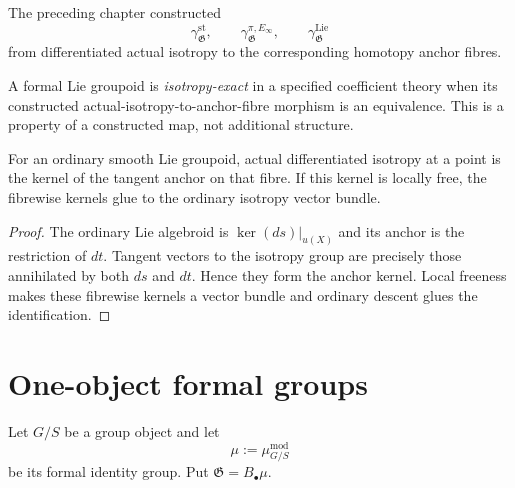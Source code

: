 The preceding chapter constructed
\[
    \gamma_{\mathfrak G}^{\mathrm{st}},
    \qquad
    \gamma_{\mathfrak G}^{\pi,E_\infty},
    \qquad
    \gamma_{\mathfrak G}^{\mathrm{Lie}}
\]
from differentiated actual isotropy to the corresponding homotopy anchor
fibres.

\begin{definition}
\label{def:as-isotropy-exact}
A formal Lie groupoid is \emph{isotropy-exact} in a specified coefficient
theory when its constructed actual-isotropy-to-anchor-fibre morphism is an
equivalence.  This is a property of a constructed map, not additional
structure.
\end{definition}

\begin{proposition}
\label{prop:as-classical-isotropy-exact}
For an ordinary smooth Lie groupoid,
actual differentiated isotropy at a point is the kernel of the tangent anchor
on that fibre.  If this kernel is locally free, the fibrewise kernels glue to
the ordinary isotropy vector bundle.
\end{proposition}

\begin{proof}
The ordinary Lie algebroid is
$\ker(ds)|_{u(X)}$ and its anchor is the restriction of $dt$.  Tangent
vectors to the isotropy group are precisely those annihilated by both $ds$
and $dt$.  Hence they form the anchor kernel.  Local freeness makes these
fibrewise kernels a vector bundle and ordinary descent glues the
identification.
\end{proof}

\section{One-object formal groups}
\label{sec:as-one-object}

Let $G/S$ be a group object and let
\[
    \mu:=\mu_{G/S}^{\mathrm{mod}}
\]
be its formal identity group.  Put
$\mathfrak G=B_\bullet\mu$.

